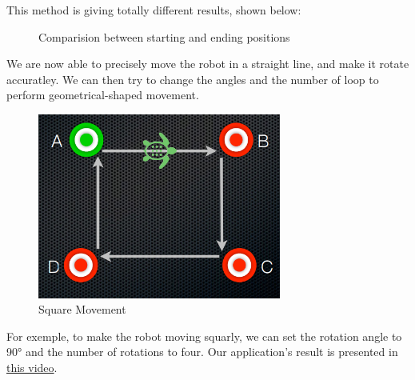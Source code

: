 \documentclass[aps,letterpaper,11pt]{revtex4}
\begin{document}
This method is giving totally different results, shown below: 

\begin{figure}[H]
    \centering
    \qquad
    \caption{Comparision between starting and ending positions}
    \label{fig:example}%
\end{figure}

We are now able to precisely move the robot in a straight line, and make it rotate accuratley. We can then try to change the angles and the number of loop to perform geometrical-shaped movement. 
\begin{figure}[H]
	\centering
	\includegraphics[width=8cm]{square.png}
	\caption{Square Movement}
	\label{fig: Square Movement}    
\end{figure}
For exemple, to make the robot moving squarly, we can set the rotation angle to 90° and the number of rotations to four. Our application's result is presented in \href{https://www.youtube.com/watch?v=kcxKbuMNRy4g}{this video}.
\end{document}

